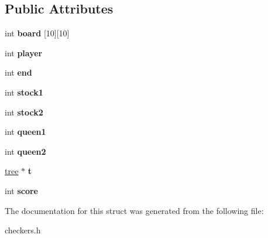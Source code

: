 \subsection*{Public Attributes}
\begin{DoxyCompactItemize}
\item 
\mbox{\label{structcheckers_ab10916b6aa2e96e60894cba6e474b808}} 
int {\bfseries board} \mbox{[}10\mbox{]}\mbox{[}10\mbox{]}
\item 
\mbox{\label{structcheckers_a602ad9c7b440f44668c7a98f5a654ece}} 
int {\bfseries player}
\item 
\mbox{\label{structcheckers_a91ece653d57630f0064c1762177bfa79}} 
int {\bfseries end}
\item 
\mbox{\label{structcheckers_aeb38744d7954f8e5042700f94104ccac}} 
int {\bfseries stock1}
\item 
\mbox{\label{structcheckers_a1fa5cb67c7f1d869fc424a291337c3d8}} 
int {\bfseries stock2}
\item 
\mbox{\label{structcheckers_a439ce9622ed4b69244de32f0f99c1f61}} 
int {\bfseries queen1}
\item 
\mbox{\label{structcheckers_a6de1957091a2737d691a319f162894dc}} 
int {\bfseries queen2}
\item 
\mbox{\label{structcheckers_a90835a5394c5ada9be5947ee5a0591f9}} 
\hyperlink{structtree}{tree} $\ast$ {\bfseries t}
\item 
\mbox{\label{structcheckers_a8d727b3458a08691bb33daf8222e2abe}} 
int {\bfseries score}
\end{DoxyCompactItemize}


The documentation for this struct was generated from the following file\+:\begin{DoxyCompactItemize}
\item 
checkers.\+h\end{DoxyCompactItemize}
